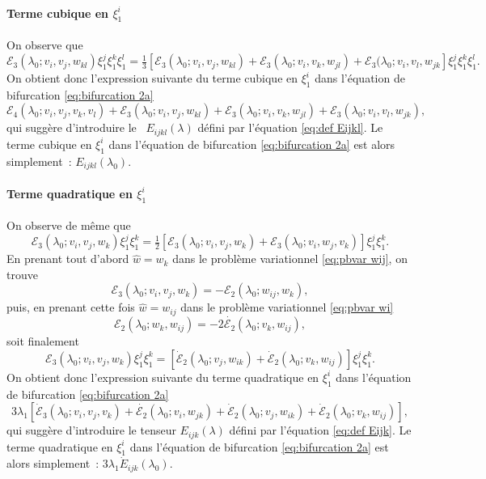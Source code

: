 \documentclass{article}
\newcommand{\nobracket}{}
\newcommand{\nocomma}{}
\begin{document}
\paragraph{Terme cubique en $\xi_1^i$}On observe que
\[ \mathcal{E}_3 (\lambda_0 ; v_i, v_j, w_{k \nocomma l}) \xi_1^j \xi_1^k
   \xi_1^l = \text{} \tfrac{1}{3}  [\mathcal{E}_3 (\lambda_0 ; v_i, v_j, w_{k
   \nocomma l}) \nobracket +\mathcal{E}_3 (\lambda_0 ; v_i, v_k, w_{j \nocomma
   l}) +\mathcal{E}_3 (\lambda_0 ; v_i, v_l, w_{j \nocomma k}] \xi_1^j \xi_1^k
   \xi_1^l . \]
On obtient donc l'expression suivante du terme cubique en $\xi_1^i$ dans
l'{\'e}quation de bifurcation \eqref{eq:bifurcation 2a}
\[ \mathcal{E}_4 (\lambda_0 ; v_i, v_j, v_k, v_l) +\mathcal{E}_3 (\lambda_0 ;
   v_i, v_j, w_{k \nocomma l}) +\mathcal{E}_3 (\lambda_0 ; v_i, v_k, w_{j
   \nocomma l}) +\mathcal{E}_3 (\lambda_0 ; v_i, v_l, w_{j \nocomma k}), \]
qui sugg{\`e}re d'introduire le \ $E_{i \nocomma j \nocomma k \nocomma l}
(\lambda)$ d{\'e}fini par l'{\'e}quation \eqref{eq:def Eijkl}. Le terme
cubique en $\xi_1^i$ dans l'{\'e}quation de bifurcation \eqref{eq:bifurcation
2a} est alors simplement~: $E_{i \nocomma j \nocomma k \nocomma l}
(\lambda_0)$.

\paragraph{Terme quadratique en $\xi_1^i$}On observe de m{\^e}me que
\[ \mathcal{E}_3 (\lambda_0 ; v_i, v_j, w_k) \xi_1^j \xi_1^k = \tfrac{1}{2}
   [\mathcal{E}_3 (\lambda_0 ; v_i, v_j, w_k) +\mathcal{E}_3 (\lambda_0 ; v_i,
   w_j, v_k)] \xi_1^j \xi_1^k . \]
En prenant tout d'abord $\widehat{w} = w_k$ dans le probl{\`e}me variationnel
\eqref{eq:pbvar wij}, on trouve
\[ \mathcal{E}_3 (\lambda_0 ; v_i, v_j, w_k) = -\mathcal{E}_2 (\lambda_0 ;
   w_{i \nocomma j}, w_k), \]
puis, en prenant cette fois $\hat{w} = w_{i \nocomma j}$ dans le probl{\`e}me
variationnel \eqref{eq:pbvar wi}
\[ \mathcal{E}_2 (\lambda_0 ; w_k, w_{i \nocomma j}) = - 2 \dot{\mathcal{E}_2}
   (\lambda_0 ; v_k, w_{i \nocomma j}), \]
soit finalement
\[ \mathcal{E}_3 (\lambda_0 ; v_i, v_j, w_k) \xi_1^j \xi_1^k =
   [\dot{\mathcal{E}}_2 (\lambda_0 ; v_j, w_{i \nocomma k}) +
   \dot{\mathcal{E}}_2 (\lambda_0 ; v_k, w_{i \nocomma j})] \xi_1^j \xi_1^k .
\]
On obtient donc l'expression suivante du terme quadratique en $\xi_1^i$ dans
l'{\'e}quation de bifurcation \eqref{eq:bifurcation 2a}
\[ 3 \lambda_1  [\dot{\mathcal{E}}_3 (\lambda_0 ; v_i, v_j, v_k) +
   \dot{\mathcal{E}_2} (\lambda_0 ; v_i, w_{j \nocomma k}) +
   \dot{\mathcal{E}}_2 (\lambda_0 ; v_j, w_{i \nocomma k}) +
   \dot{\mathcal{E}}_2 (\lambda_0 ; v_k, w_{i \nocomma j})], \]
qui sugg{\`e}re d'introduire le tenseur $E_{i \nocomma j \nocomma k}
(\lambda)$ d{\'e}fini par l'{\'e}quation \eqref{eq:def Eijk}. Le terme
quadratique en $\xi_1^i$ dans l'{\'e}quation de bifurcation
\eqref{eq:bifurcation 2a} est alors simplement~: $3 \lambda_1  \dot{E}_{i
\nocomma j \nocomma k} (\lambda_0)$.
\end{document}
